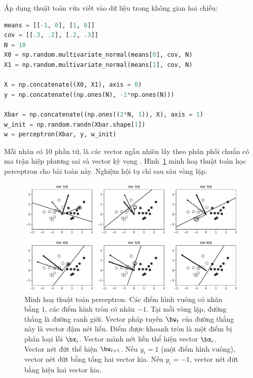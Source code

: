 Áp dụng thuật toán vừa viết vào dữ liệu trong không gian hai chiều:
\begin{lstlisting}[language=Python]
means = [[-1, 0], [1, 0]]
cov = [[.3, .2], [.2, .3]]
N = 10
X0 = np.random.multivariate_normal(means[0], cov, N)
X1 = np.random.multivariate_normal(means[1], cov, N)

X = np.concatenate((X0, X1), axis = 0)
y = np.concatenate((np.ones(N), -1*np.ones(N)))

Xbar = np.concatenate((np.ones((2*N, 1)), X), axis = 1)
w_init = np.random.randn(Xbar.shape[1])
w = perceptron(Xbar, y, w_init)
\end{lstlisting}
Mỗi nhãn có 10 phần tử, là các vector ngẫu nhiên lấy theo phân phối chuẩn có ma trận hiệp phương sai  và vector kỳ vọng . Hình~\ref{fig:9_vis} minh hoạ thuật toán học perceptron cho bài toán này. Nghiệm hội tụ chỉ sau sáu vòng lặp. 
\begin{figure}[t]
\centering
    \includegraphics[width = \textwidth]{ebookML_src/src/perceptron/pla_visualize1.pdf}
    \caption[]{Minh hoạ thuật toán perceptron. Các điểm hình vuông có nhãn bằng $1$, các điểm hình tròn có nhãn $-1$. Tại mỗi vòng lặp, đường thẳng là đường ranh giới. Vector pháp tuyến $\bw_t$ của đường thằng này là vector đậm nét liền. Điểm được khoanh tròn là một điểm bị phân loại lỗi $\bx_i$. Vector mảnh nét liền thể hiện vector $\bx_i$. Vector nét đứt thể hiện $\bw_{t+1}$. Nếu $y_i = 1$ (một điểm hình vuông), vector nét đứt bằng tổng hai vector kia. Nếu $y_i = -1$, vector nét đứt bằng hiệu hai vector kia.}
    \label{fig:9_vis}
\end{figure}

